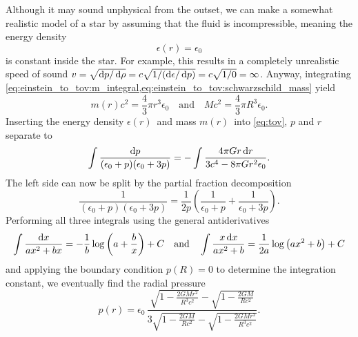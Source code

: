 Although it may sound unphysical from the outset, we can make a somewhat realistic model of a star by assuming that the fluid is incompressible, meaning the energy density
\begin{equation}
	\epsilon(r) = \epsilon_0
\end{equation}
is constant inside the star.
For example, this results in a completely unrealistic speed of sound $v = \sqrt{\mathop{}\!\mathrm{d} p / \mathop{}\!\mathrm{d} \rho} = c \sqrt{1/(\mathop{}\!\mathrm{d} \epsilon / \mathop{}\!\mathrm{d} p)} = c \sqrt{1/0} = \infty$. \cite{ref:speed_of_sound}
Anyway, integrating \cref{eq:einstein_to_tov:m_integral,eq:einstein_to_tov:schwarzschild_mass} yield
\begin{equation}
	m(r) c^2 = \frac{4}{3} \pi r^3 \epsilon_0 
	\quad \text{and} \quad
	M c^2 = \frac{4}{3} \pi R^3 \epsilon_0 
	.
\end{equation}
Inserting the energy density $\epsilon(r)$ and mass $m(r)$ into \cref{eq:tov}, $p$ and $r$ separate to
\begin{equation*}
	\int \frac{\mathop{}\!\mathrm{d} p}{(\epsilon_0+p)(\epsilon_0+3p)} = - \int \frac{4 \pi G r \mathop{}\!\mathrm{d} r}{3 c^4 - 8\pi G r^2 \epsilon_0} .
\end{equation*}
The left side can now be split by the partial fraction decomposition
\begin{equation*}
	\frac{1}{(\epsilon_0+p)(\epsilon_0+3p)} = \frac{1}{2p} \left( \frac{1}{\epsilon_0+p} + \frac{1}{\epsilon_0+3p} \right) .
\end{equation*}
Performing all three integrals using the general antiderivatives
\begin{equation*}
	\int \frac{\mathop{}\!\mathrm{d} x}{a x^2 + b x} = -\frac{1}{b} \log \left( a + \frac{b}{x} \right) + C
	\quad \text{and} \quad
	\int \frac{x \mathop{}\!\mathrm{d} x}{a x^2 + b} = \frac{1}{2 a} \log \left( a x^2 + b \right) + C
\end{equation*}
and applying the boundary condition $p(R) = 0$ to determine the integration constant, we eventually find the radial pressure
\begin{equation}
	p(r) = \epsilon_0 \, \frac{\sqrt{1-\frac{2GMr^2}{R^3c^2}} - \sqrt{1-\frac{2GM}{Rc^2}}}{3 \sqrt{1-\frac{2GM}{Rc^2}} - \sqrt{1-\frac{2GMr^2}{R^3c^2}}} .
	\label{eq:incompressible_star:pressure}
\end{equation}
